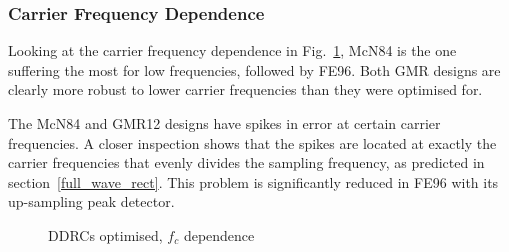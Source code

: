 \documentclass[../main2.tex]{subfiles}
\providecommand{\rootdir}{..}
\begin{document}
\subsubsection{Carrier Frequency Dependence}
Looking at the carrier frequency dependence in Fig.~\ref{fig:complete_DDRC_opt_fc_dep}, McN84 is the one suffering the most for low frequencies, followed by FE96. Both GMR designs are clearly more robust to lower carrier frequencies than they were optimised for.

The McN84 and GMR12 designs have spikes in error at certain carrier frequencies. A closer inspection shows that the spikes are located at exactly the carrier frequencies that evenly divides the sampling frequency, as predicted in section~\ref{full_wave_rect}. This problem is significantly reduced in FE96 with its up-sampling peak detector.

\begin{figure}[h]
\centerline{}
\caption{DDRCs optimised, $f_c$ dependence}
\label{fig:complete_DDRC_opt_fc_dep}
\end{figure}
\end{document}
